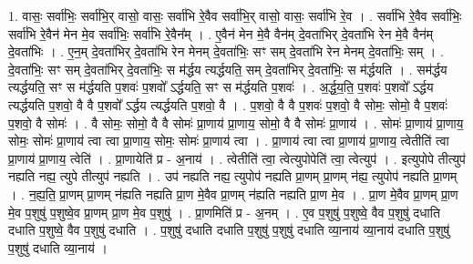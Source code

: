 \documentclass[17pt]{extarticle}
\begin{document}
1. वासः॒ सर्वा॑भिः॒ सर्वा॑भि॒र् वासो॒ वासः॒ सर्वा॑भि रे॒वैव सर्वा॑भि॒र् वासो॒ वासः॒ सर्वा॑भि रे॒व । . सर्वा॑भि रे॒वैव सर्वा॑भिः॒ सर्वा॑भि रे॒वैन॑ मेन मे॒व सर्वा॑भिः॒ सर्वा॑भि रे॒वैन᳚म् । . ए॒वैन॑ मेन मे॒वै वैन॑म् दे॒वता॑भिर् दे॒वता॑भि रेन मे॒वै वैन॑म् दे॒वता॑भिः । . ए॒न॒म् दे॒वता॑भिर् दे॒वता॑भि रेन मेनम् दे॒वता॑भिः॒ सꣳ सम् दे॒वता॑भि रेन मेनम् दे॒वता॑भिः॒ सम् । . दे॒वता॑भिः॒ सꣳ सम् दे॒वता॑भिर् दे॒वता॑भिः॒ स म॑र्द्धय त्यर्द्धयति॒ सम् दे॒वता॑भिर् दे॒वता॑भिः॒ स म॑र्द्धयति । . सम॑र्द्धय त्यर्द्धयति॒ सꣳ स म॑र्द्धयति प॒शवः॑ प॒शवो᳚ ऽर्द्धयति॒ सꣳ स म॑र्द्धयति प॒शवः॑ । . अ॒र्द्ध॒य॒ति॒ प॒शवः॑ प॒शवो᳚ ऽर्द्धय त्यर्द्धयति प॒शवो॒ वै वै प॒शवो᳚ ऽर्द्धय त्यर्द्धयति प॒शवो॒ वै । . प॒शवो॒ वै वै प॒शवः॑ प॒शवो॒ वै सोमः॒ सोमो॒ वै प॒शवः॑ प॒शवो॒ वै सोमः॑ । . वै सोमः॒ सोमो॒ वै वै सोमः॑ प्रा॒णाय॑ प्रा॒णाय॒ सोमो॒ वै वै सोमः॑ प्रा॒णाय॑ । . सोमः॑ प्रा॒णाय॑ प्रा॒णाय॒ सोमः॒ सोमः॑ प्रा॒णाय॑ त्वा त्वा प्रा॒णाय॒ सोमः॒ सोमः॑ प्रा॒णाय॑ त्वा । . प्रा॒णाय॑ त्वा त्वा प्रा॒णाय॑ प्रा॒णाय॒ त्वेतीति॑ त्वा प्रा॒णाय॑ प्रा॒णाय॒ त्वेति॑ । . प्रा॒णायेति॑ प्र - अ॒नाय॑ । . त्वेतीति॑ त्वा॒ त्वेत्युपोपेति॑ त्वा॒ त्वेत्युप॑ । . इत्युपोपे तीत्युप॑ नह्यति नह्य॒ त्युपे तीत्युप॑ नह्यति । . उप॑ नह्यति नह्य॒ त्युपोप॑ नह्यति प्रा॒णम् प्रा॒णम् न॑ह्य॒ त्युपोप॑ नह्यति प्रा॒णम् । . न॒ह्य॒ति॒ प्रा॒णम् प्रा॒णम् न॑ह्यति नह्यति प्रा॒ण मे॒वैव प्रा॒णम् न॑ह्यति नह्यति प्रा॒ण मे॒व । . प्रा॒ण मे॒वैव प्रा॒णम् प्रा॒ण मे॒व प॒शुषु॑ प॒शुष्वे॒व प्रा॒णम् प्रा॒ण मे॒व प॒शुषु॑ । . प्रा॒णमिति॑ प्र - अ॒नम् । . ए॒व प॒शुषु॑ प॒शुष्वे॒ वैव प॒शुषु॑ दधाति दधाति प॒शुष्वे॒ वैव प॒शुषु॑ दधाति । . प॒शुषु॑ दधाति दधाति प॒शुषु॑ प॒शुषु॑ दधाति व्या॒नाय॑ व्या॒नाय॑ दधाति प॒शुषु॑ प॒शुषु॑ दधाति व्या॒नाय॑ । \newline
\end{document}
